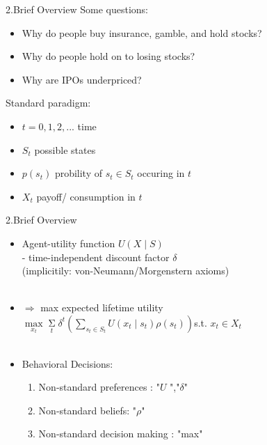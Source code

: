 \documentclass[11pt,aspectratio=169]{beamer}
\begin{document}
\begin{frame}{2.Brief Overview}
 Some questions:
    \begin{itemize}
        \item Why do people buy insurance, gamble, and hold stocks?\medskip
        \item Why do people hold on to losing stocks?
        \item Why are IPOs underpriced?
    \end{itemize}
Standard paradigm:
    \begin{itemize}
        \item $t= 0,1,2,...$ time
        \item $S_t$ possible states
        \item $p(s_t)$ probility of $s_t \in S_t$ occuring in $t$
        \item $X_t$ payoff/ consumption in $t$
    \end{itemize}
\end{frame}


\begin{frame}{2.Brief Overview}
\begin{itemize}
    \item Agent-utility function $U(X\mid S)$ \\
\quad - time-independent discount factor $\delta $\\
(implicitily: von-Neumann/Morgenstern axioms)\\
\hspace*{\fill} \\
    \item $\Rightarrow$ max  expected lifetime utility\\
$ \mathop{\max}\limits_{x_t} \mathop{\Sigma}\limits_{t}  \delta^t (\mathop{\sum}\limits_{s_t \in S_t} U(x_t \mid s_t)\rho (s_t)) $\qquad s.t. $x_t \in X_t $\\
\hspace*{\fill} \\
    \item Behavioral Decisions:
    \begin{enumerate}[1.)]
        \item Non-standard preferences : "$U$ ","$\delta $"
        \item Non-standard beliefs: "$\rho$"
        \item Non-standard decision making : "max"
    \end{enumerate}
\end{itemize}
\end{frame}
\end{document}
